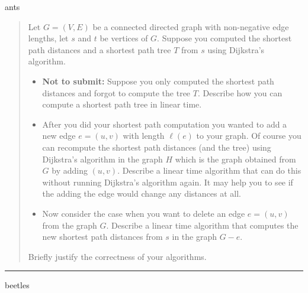 \documentclass[11pt]{article}
\begin{document}
\begin{solution}
    ants
\end{solution}


\begin{quote}
Let $G = (V, E)$ be a connected directed graph with non-negative
  edge lengths, let $s$ and $t$ be vertices of $G$. Suppose you
  computed the shortest path distances and a shortest path tree $T$
  from $s$ using Dijkstra's algorithm.

  \begin{itemize}
  \item {\bf Not to submit:} Suppose you only computed the shortest
    path distances and forgot to compute the tree $T$. Describe how
    you can compute a shortest path tree in linear time.
  \item After you did your shortest path computation you wanted to add
    a new edge $e=(u,v)$ with length $\ell(e)$ to your graph. Of
    course you can recompute the shortest path distances (and the tree) using Dijkstra's
    algorithm in the graph $H$ which is the graph obtained from $G$ by
    adding $(u,v)$. Describe a linear time algorithm that can do this
    without running Dijkstra's algorithm again. It may help you to see
    if the adding the edge would change any distances at all.
  \item Now consider the case when you want to delete an edge
    $e=(u,v)$ from the graph $G$. Describe a linear time algorithm that
    computes the new shortest path distances from $s$ in the graph $G-e$.
  \end{itemize}
  Briefly justify the correctness of your algorithms.
\end{quote}
\hrule



\begin{solution}
    beetles
\end{solution}

\end{document}
